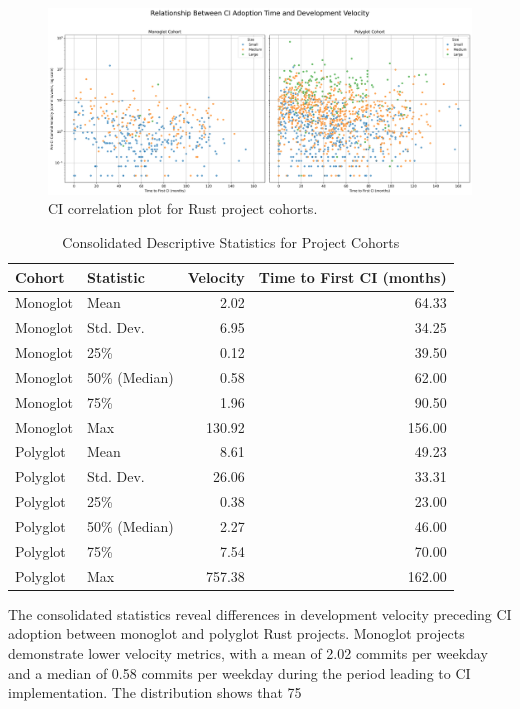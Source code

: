 \documentclass[11pt]{article}
\begin{document}
\begin{figure}[htbp]
  \centering
  \includegraphics[width=\linewidth]{figures/ci_correlation_plot.jpg}
  \caption{CI correlation plot for Rust project cohorts.}
  \label{fig:ci_correlation_plot}
\end{figure}

\begin{table}[htbp]
\centering
\caption{Consolidated Descriptive Statistics for Project Cohorts}
\label{tab:cohort_stats_consolidated}
\begin{tabular}{llrr}
\toprule
\textbf{Cohort} & \textbf{Statistic} & \textbf{Velocity} & \textbf{Time to First CI (months)} \\
\midrule
Monoglot & Mean          & 2.02     & 64.33    \\
Monoglot & Std. Dev.     & 6.95     & 34.25    \\
Monoglot & 25\%          & 0.12     & 39.50    \\
Monoglot & 50\% (Median) & 0.58     & 62.00    \\
Monoglot & 75\%          & 1.96     & 90.50    \\
Monoglot & Max           & 130.92   & 156.00   \\
\midrule
Polyglot & Mean          & 8.61     & 49.23    \\
Polyglot & Std. Dev.     & 26.06    & 33.31    \\
Polyglot & 25\%          & 0.38     & 23.00    \\
Polyglot & 50\% (Median) & 2.27     & 46.00    \\
Polyglot & 75\%          & 7.54     & 70.00    \\
Polyglot & Max           & 757.38   & 162.00   \\
\bottomrule
\end{tabular}
\end{table}

The consolidated statistics reveal differences in development velocity preceding CI adoption between monoglot and polyglot Rust projects. Monoglot projects demonstrate lower velocity metrics, with a mean of 2.02 commits per weekday and a median of 0.58 commits per weekday during the period leading to CI implementation. The distribution shows that 75%
\end{document}
